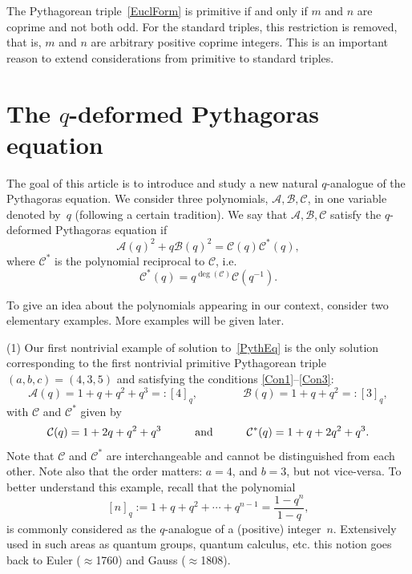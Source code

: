 \documentclass{article}[12pt]
\theoremstyle{plain}
\theoremstyle{definition}
\newcommand{\A}{\mathcal{A}}
\newcommand{\B}{\mathcal{B}}
\newcommand{\cC}{\mathcal{C}}
\begin{document}
The Pythagorean triple~\eqref{EuclForm} is primitive if and only if
$m$ and $n$ are coprime and not both odd.
For the  standard triples, this restriction is removed, that is,
$m$ and $n$ are arbitrary positive coprime integers.
This is an important reason to extend considerations from primitive to standard triples.


\section{The $q$-deformed Pythagoras equation}


The goal of this article is to introduce and study 
a new natural $q$-analogue of the Pythagoras equation.
We consider three polynomials,
$\A,\B,\cC$, in one variable denoted by~$q$ (following a certain tradition).
We say that $\A,\B,\cC$ satisfy the $q$-deformed Pythagoras equation if
\begin{equation}
\label{PythEq}
\A(q)^2+q\B(q)^2=\cC(q)\cC^*(q),
\end{equation}
where $\cC^*$ is the polynomial reciprocal to $\cC$, i.e.
\begin{equation}
\label{RecipEq}
\cC^*(q)=q^{\deg(\cC)}\cC(q^{-1}).
\end{equation}

To give an idea about the polynomials appearing
in our context, consider two elementary examples.
More examples will be given later.

(1)
Our first nontrivial example of solution to~\eqref{PythEq} is
the only solution corresponding to the first nontrivial primitive Pythagorean triple $(a,b,c)=(4,3,5)$
and satisfying the conditions \ref{Con1}--\ref{Con3}:
$$
\A(q)=1+q+q^2+q^3=:\left[4\right]_q,
\qquad\qquad
\B(q)=1+q+q^2=:\left[3\right]_q,
$$
with $\cC$ and $\cC^*$ given by
$$
\cC(q)=1+2q+q^2+q^3
\qquad\quad\hbox{and}\quad\qquad
\cC^*(q)=1+q+2q^2+q^3.
$$
Note that $\cC$ and $\cC^*$ are interchangeable and cannot be distinguished from each other.
Note also that the order matters: $a=4$, and $b=3$, but not vice-versa.
To better understand this example, recall that the polynomial
\begin{equation}
\label{qBn}
\left[n\right]_{q}:=1+q+q^{2}+\cdots+q^{n-1}=\textstyle\frac{1-q^n}{1-q},
\end{equation}
is commonly considered as the $q$-analogue of a (positive) integer~$n$.
Extensively used in such areas as quantum groups, quantum calculus, etc. this
notion goes back to Euler ($\approx$1760) and Gauss ($\approx$1808).
\end{document}
